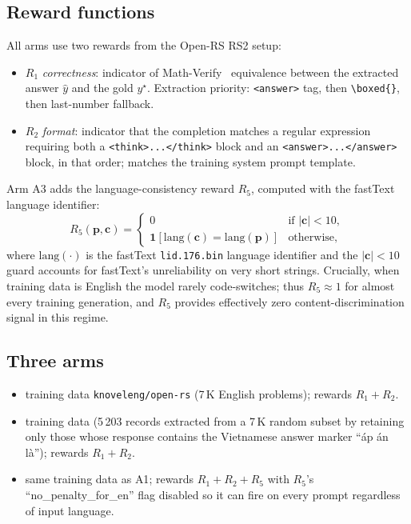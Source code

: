 \documentclass[journal,onecolumn,11pt]{IEEEtran}
\newcommand{\armA}{\textsc{A1}}
\newcommand{\armB}{\textsc{A2}}
\newcommand{\armC}{\textsc{A3}}
\newcommand{\R}[1]{R_{#1}}
\begin{document}
\subsection{Reward functions}
\label{sec:rewards}
All arms use two rewards from the Open-RS RS2 setup:
\begin{itemize}\itemsep0pt
\item $\R{1}$ \emph{correctness}: indicator of
Math-Verify~\cite{mathverify_2024} equivalence between the extracted
answer $\hat{y}$ and the gold $y^\star$. Extraction priority:
\texttt{<answer>} tag, then \texttt{\textbackslash boxed\{\}}, then
last-number fallback.
\item $\R{2}$ \emph{format}: indicator that the completion matches a regular
expression requiring both a \texttt{<think>...</think>} block and an
\texttt{<answer>...</answer>} block, in that order; matches the training
system prompt template.
\end{itemize}
Arm \armC{} adds the language-consistency reward
$\R{5}$, computed with the fastText~\cite{joulin2017fasttext}
language identifier:
\begin{equation}
\R{5}(\mathbf{p},\mathbf{c}) =
\begin{cases}
0 & \text{if } |\mathbf{c}| < 10,\\[2pt]
\mathbf{1}\!\left[\mathrm{lang}(\mathbf{c}) = \mathrm{lang}(\mathbf{p})\right]
                & \text{otherwise,}
\end{cases}
\label{eq:r5}
\end{equation}
where $\mathrm{lang}(\cdot)$ is the fastText \texttt{lid.176.bin} language
identifier and the $|\mathbf{c}|<10$ guard accounts for fastText's
unreliability on very short strings. Crucially, when training data is
English the model rarely code-switches; thus $\R{5}\approx 1$ for almost
every training generation, and $\R{5}$ provides effectively zero
content-discrimination signal in this regime.

\subsection{Three arms}
\begin{itemize}\itemsep0pt
\item[\armA{} -- English-only:] training data \texttt{knoveleng/open-rs}
(7\,K English problems); rewards $\R{1}+\R{2}$.
\item[\armB{} -- Vietnamese-translated:] training data
 (5\,203 records
extracted from a 7\,K random subset by retaining only those whose response
contains the Vietnamese answer marker ``\DJ\'ap \'an l\`a''); rewards
$\R{1}+\R{2}$.
\item[\armC{} -- English with $\R{5}$:] same training data as \armA{};
rewards $\R{1}+\R{2}+\R{5}$ with $\R{5}$'s ``no\_penalty\_for\_en'' flag
disabled so it can fire on every prompt regardless of input language.
\end{itemize}
\end{document}
